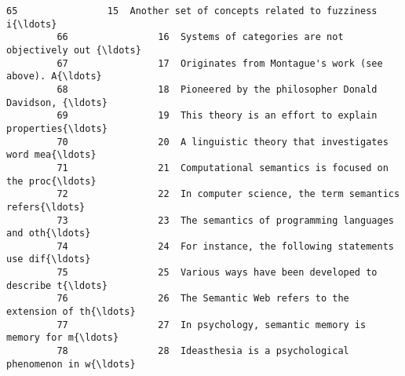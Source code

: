 \documentclass[11pt]{article}
\begin{document}
\begin{Verbatim}[commandchars=\\\{\}]
         65                15  Another set of concepts related to fuzziness i{\ldots}   
         66                16  Systems of categories are not objectively out {\ldots}   
         67                17  Originates from Montague's work (see above). A{\ldots}   
         68                18  Pioneered by the philosopher Donald Davidson, {\ldots}   
         69                19  This theory is an effort to explain properties{\ldots}   
         70                20  A linguistic theory that investigates word mea{\ldots}   
         71                21  Computational semantics is focused on the proc{\ldots}   
         72                22  In computer science, the term semantics refers{\ldots}   
         73                23  The semantics of programming languages and oth{\ldots}   
         74                24  For instance, the following statements use dif{\ldots}   
         75                25  Various ways have been developed to describe t{\ldots}   
         76                26  The Semantic Web refers to the extension of th{\ldots}   
         77                27  In psychology, semantic memory is memory for m{\ldots}   
         78                28  Ideasthesia is a psychological phenomenon in w{\ldots}   
         

\end{Verbatim}
\end{document}
